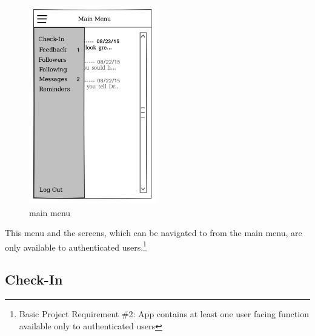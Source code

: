 \documentclass{article}
\begin{document}
    \begin{figure}[h]
        \centering
        \includegraphics[width=0.5\textwidth,height=\textheight,keepaspectratio]{main.png}
        \caption{main menu}
        \label{fig:screen_main}
    \end{figure}


    This menu and the screens, which can be navigated to from the main menu, are only available to authenticated users.\footnote{Basic Project Requirement \#2: App contains at least one user facing function available only to authenticated users}

    \subsection{Check-In}
\end{document}
